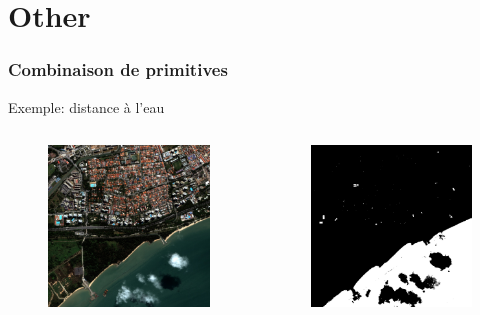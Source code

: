\documentclass[compress]{beamer}
\begin{document}
\section{Other}


\begin{frame}
\frametitle{Combinaison de primitives}
Exemple: distance à l'eau
\begin{columns}
\begin{column}{0.32\textwidth}
\begin{figure}[]
  \includegraphics[width=1.0\textwidth]{radio2-extract-3b.jpg}
\end{figure}
\end{column}
\begin{column}{0.32\textwidth}
\begin{figure}[]
  \includegraphics[width=1.0\textwidth]{MNDWI2-threshold.jpg}

\end{figure}
\end{column}
\end{columns}
\end{frame}
\end{document}
